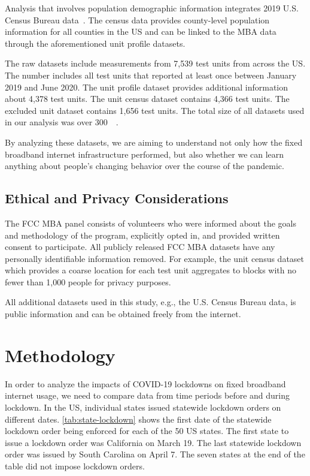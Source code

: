 \documentclass[conference,10pt]{IEEEtran}
\begin{document}
Analysis that involves population demographic information integrates 2019 U.S. Census Bureau data~\cite{census}. The census data provides county-level population information for all counties in the \gls{US} and can be linked to the \gls{MBA} data through the aforementioned unit profile datasets.

The raw datasets include measurements from 7,539 test units from across the \gls{US}. The number includes all test units that reported at least once between January 2019 and June 2020. The unit profile dataset provides additional information about 4,378 test units. The unit census dataset contains 4,366 test units. The excluded unit dataset contains 1,656 test units. The total size of all datasets used in our analysis was over \SI{300}{\giga\byte}.

By analyzing these datasets, we are aiming to understand not only how the fixed broadband internet infrastructure performed, but also whether we can learn anything about people's changing behavior over the course of the pandemic.

\subsection{Ethical and Privacy Considerations}\label{sec:ethical-and-privacy-considerations}

The \gls{FCC} \gls{MBA} panel consists of volunteers who were informed about the goals and methodology of the program, explicitly opted in, and provided written consent to participate. All publicly released \gls{FCC} \gls{MBA} datasets have any personally identifiable information removed. For example, the unit census dataset which provides a coarse location for each test unit aggregates to blocks with no fewer than 1,000 people for privacy purposes.

All additional datasets used in this study, e.g., the U.S. Census Bureau data, is public information and can be obtained freely from the internet.

\section{Methodology}\label{sec:methodology}

In order to analyze the impacts of COVID-19 lockdowns on fixed broadband internet usage, we need to compare data from time periods before and during lockdown. In the \gls{US}, individual states issued statewide lockdown orders on different dates. \cref{tab:state-lockdown} shows the first date of the statewide lockdown order being enforced for each of the 50 \gls{US} states. The first state to issue a lockdown order was California on March 19. The last statewide lockdown order was issued by South Carolina on April 7. The seven states at the end of the table did not impose lockdown orders.
\end{document}
